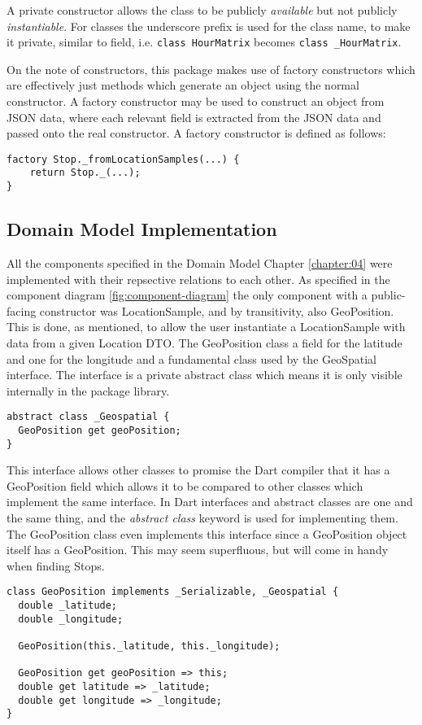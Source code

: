 A private constructor allows the class to be publicly \textit{available} but not publicly \textit{instantiable}. For classes the underscore prefix is used for the class name, to make it private, similar to field, i.e. \verb|class HourMatrix| becomes \verb|class _HourMatrix|.

On the note of constructors, this package makes use of factory constructors which are effectively just methods which generate an object using the normal constructor. A factory constructor may be used to construct an object from JSON data, where each relevant field is extracted from the JSON data and passed onto the real constructor. A factory constructor is defined as follows:
\begin{verbatim}
factory Stop._fromLocationSamples(...) {
	return Stop._(...);
}
\end{verbatim}

\subsection{Domain Model Implementation}
All the components specified in the Domain Model Chapter \ref{chapter:04} were implemented with their repsective relations to each other. As specified in the component diagram \ref{fig:component-diagram} the only component with a public-facing constructor was LocationSample, and by transitivity, also GeoPosition. This is done, as mentioned, to allow the user instantiate a LocationSample with data from a given Location DTO. The GeoPosition class a field for the latitude and one for the longitude and a fundamental class used by the GeoSpatial interface. The interface is a private abstract class which means it is only visible internally in the package library.

\begin{verbatim}
abstract class _Geospatial {
  GeoPosition get geoPosition;
}
\end{verbatim}

This interface allows other classes to promise the Dart compiler that it has a GeoPosition field which allows it to be compared to other classes which implement the same interface. In Dart interfaces and abstract classes are one and the same thing, and the \textit{abstract class} keyword is used for implementing them. The GeoPosition class even implements this interface since a GeoPosition object itself has a GeoPosition. This may seem superfluous, but will come in handy when finding Stops.

\begin{verbatim}
class GeoPosition implements _Serializable, _Geospatial {
  double _latitude;
  double _longitude;

  GeoPosition(this._latitude, this._longitude);

  GeoPosition get geoPosition => this;
  double get latitude => _latitude;
  double get longitude => _longitude;
}
\end{verbatim}

